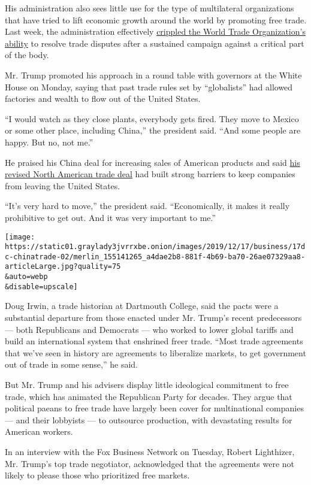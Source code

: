His administration also sees little use for the type of multilateral
organizations that have tried to lift economic growth around the world
by promoting free trade. Last week, the administration effectively
\href{https://www.nytimes3xbfgragh.onion/2019/12/08/business/trump-trade-war-wto.html}{crippled
the World Trade Organization's ability} to resolve trade disputes after
a sustained campaign against a critical part of the body.

Mr. Trump promoted his approach in a round table with governors at the
White House on Monday, saying that past trade rules set by
``globalists'' had allowed factories and wealth to flow out of the
United States.

``I would watch as they close plants, everybody gets fired. They move to
Mexico or some other place, including China,'' the president said. ``And
some people are happy. But no, not me.''

He praised his China deal for increasing sales of American products and
said
\href{https://www.nytimes3xbfgragh.onion/2019/12/10/us/politics/usmca-trade-deal.html}{his
revised North American trade deal} had built strong barriers to keep
companies from leaving the United States.

``It's very hard to move,'' the president said. ``Economically, it makes
it really prohibitive to get out. And it was very important to me.''

\texttt{[image: https://static01.graylady3jvrrxbe.onion/images/2019/12/17/business/17dc-chinatrade-02/merlin\_155141265\_a4dae2b8-881f-4b69-ba70-26ae07329aa8-articleLarge.jpg?quality=75\\\&auto=webp\\\&disable=upscale]}

Doug Irwin, a trade historian at Dartmouth College, said the pacts were
a substantial departure from those enacted under Mr. Trump's recent
predecessors --- both Republicans and Democrats --- who worked to lower
global tariffs and build an international system that enshrined freer
trade. ``Most trade agreements that we've seen in history are agreements
to liberalize markets, to get government out of trade in some sense,''
he said.

But Mr. Trump and his advisers display little ideological commitment to
free trade, which has animated the Republican Party for decades. They
argue that political paeans to free trade have largely been cover for
multinational companies --- and their lobbyists --- to outsource
production, with devastating results for American workers.

In an interview with the Fox Business Network on Tuesday, Robert
Lighthizer, Mr. Trump's top trade negotiator, acknowledged that the
agreements were not likely to please those who prioritized free markets.

